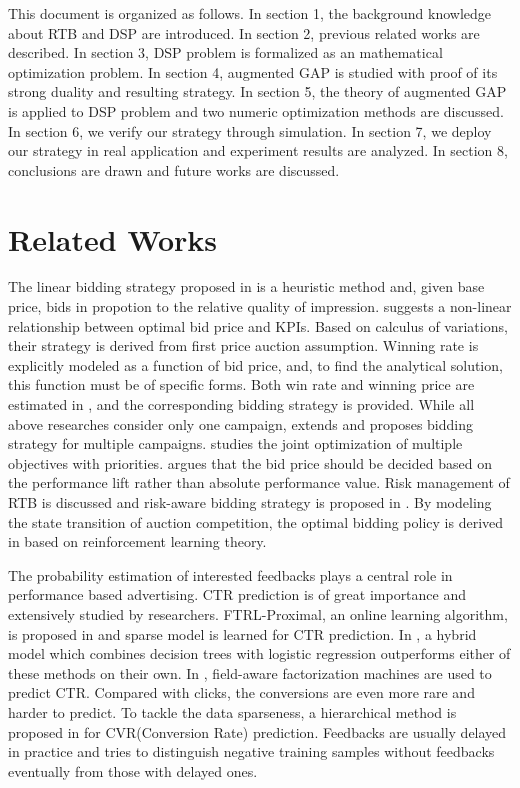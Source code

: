 \documentclass[sigconf]{acmart}
\begin{document}
This document is organized as follows.
In section 1, the background knowledge about RTB and DSP are introduced.
In section 2, previous related works are described.
In section 3, DSP problem is formalized as an mathematical optimization problem.
In section 4, augmented GAP is studied with proof of its strong duality and resulting strategy.
In section 5, the theory of augmented GAP is applied to DSP problem and two numeric optimization methods are discussed.
In section 6, we verify our strategy through simulation.
In section 7, we deploy our strategy in real application and experiment results are analyzed.
In section 8, conclusions are drawn and future works are discussed.

\section{Related Works}

The linear bidding strategy proposed in \cite{M6D} is a heuristic method and,
    given base price, bids in propotion to the relative quality of impression.
\cite{WeinanZhang2014} suggests a non-linear relationship between optimal bid price and KPIs.
Based on calculus of variations, their strategy is derived from first price auction assumption.
Winning rate is explicitly modeled as a function of bid price, and,
    to find the analytical solution, this function must be of specific forms.
Both win rate and winning price are estimated in \cite{XiangLi2014}, and the corresponding bidding strategy is provided.
While all above researches consider only one campaign,
    \cite{WeinanZhang2015} extends \cite{WeinanZhang2014} and proposes bidding strategy for multiple campaigns.
\cite{Joint2016} studies the joint optimization of multiple objectives with priorities.
\cite{Lift2016} argues that the bid price should be decided
    based on the performance lift rather than absolute performance value.
Risk management of RTB is discussed and risk-aware bidding strategy is proposed in \cite{Risk2017}.
By modeling the state transition of auction competition,
    the optimal bidding policy is derived in \cite{Reinforce2017} based on reinforcement learning theory.

The probability estimation of interested feedbacks plays a central role in performance based advertising.
CTR prediction is of great importance and extensively studied by researchers.
FTRL-Proximal, an online learning algorithm, is proposed in \cite{Google2013} and sparse model is learned for CTR prediction.
In \cite{Facebook2014}, a hybrid model which combines decision trees with logistic regression
    outperforms either of these methods on their own.
In \cite{FFM2016}, field-aware factorization machines are used to predict CTR.
Compared with clicks, the conversions are even more rare and harder to predict.
To tackle the data sparseness, a hierarchical method is proposed in \cite{CVR} for CVR(Conversion Rate) prediction.
Feedbacks are usually delayed in practice and \cite{DelayedFeedback} tries to
    distinguish negative training samples without feedbacks eventually from those with delayed ones.
\end{document}
